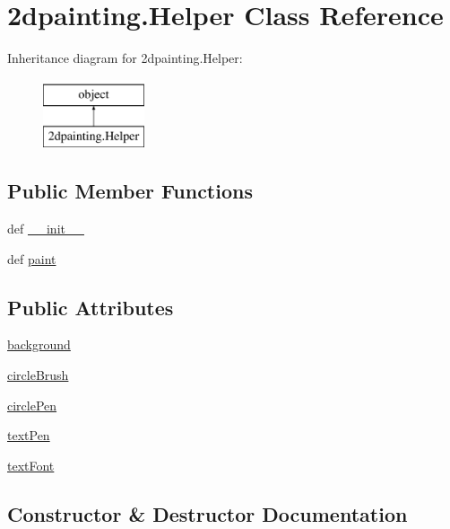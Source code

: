 \hypertarget{class2dpainting_1_1Helper}{}\section{2dpainting.Helper Class Reference}
\label{class2dpainting_1_1Helper}
Inheritance diagram for 2dpainting.Helper\+:\begin{figure}[H]
\begin{center}
\leavevmode
\includegraphics[height=2.000000cm]{class2dpainting_1_1Helper}
\end{center}
\end{figure}
\subsection*{Public Member Functions}
\begin{DoxyCompactItemize}
\item 
def \hyperlink{class2dpainting_1_1Helper_a338e39c74a3e4f6c8de5e3cd3561edfe}{\+\_\+\+\_\+init\+\_\+\+\_\+}
\item 
def \hyperlink{class2dpainting_1_1Helper_aa87233383a8eabad7371089d872fcb9b}{paint}
\end{DoxyCompactItemize}
\subsection*{Public Attributes}
\begin{DoxyCompactItemize}
\item 
\hyperlink{class2dpainting_1_1Helper_ad90671d4de760acac57d14bac32476e6}{background}
\item 
\hyperlink{class2dpainting_1_1Helper_abc1fbb88b9c85b4751ace5734a54842f}{circle\+Brush}
\item 
\hyperlink{class2dpainting_1_1Helper_a751be71e1d38c9229ed11cf856db4289}{circle\+Pen}
\item 
\hyperlink{class2dpainting_1_1Helper_a3e738110b25b650e700580c59445a60e}{text\+Pen}
\item 
\hyperlink{class2dpainting_1_1Helper_aaa679b100cd6f7d1668a564775377693}{text\+Font}
\end{DoxyCompactItemize}


\subsection{Constructor \& Destructor Documentation}
\hypertarget{class2dpainting_1_1Helper_a338e39c74a3e4f6c8de5e3cd3561edfe}{}
